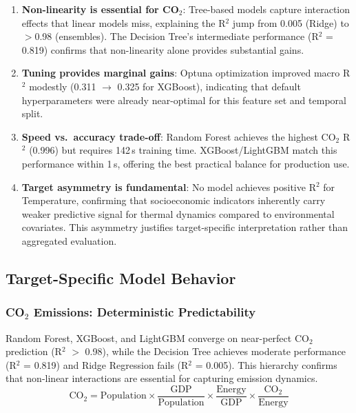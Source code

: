 \documentclass[12pt, a4paper]{article}
\begin{document}
\begin{enumerate}[label=(\arabic*), leftmargin=*]
    \item \textbf{Non-linearity is essential for CO$_2$}: Tree-based models capture interaction effects that linear models miss, explaining the R$^2$ jump from 0.005 (Ridge) to $>$0.98 (ensembles). The Decision Tree's intermediate performance (R$^2$ = 0.819) confirms that non-linearity alone provides substantial gains.
    
    \item \textbf{Tuning provides marginal gains}: Optuna optimization improved macro R$^2$ modestly (0.311 $\rightarrow$ 0.325 for XGBoost), indicating that default hyperparameters were already near-optimal for this feature set and temporal split.
    
    \item \textbf{Speed vs.\ accuracy trade-off}: Random Forest achieves the highest CO$_2$ R$^2$ (0.996) but requires 142\,s training time. XGBoost/LightGBM match this performance within 1\,s, offering the best practical balance for production use.
    
  
    \item \textbf{Target asymmetry is fundamental}: No model achieves positive R$^2$ for Temperature, confirming that socioeconomic indicators inherently carry weaker predictive signal for thermal dynamics compared to environmental covariates. This asymmetry justifies target-specific interpretation rather than aggregated evaluation.
\end{enumerate}

\subsection{Target-Specific Model Behavior}
\subsubsection{CO$_2$ Emissions: Deterministic Predictability}
Random Forest, XGBoost, and LightGBM converge on near-perfect CO$_2$ prediction (R$^2$ $>$ 0.98), while the Decision Tree achieves moderate performance (R$^2$ = 0.819) and Ridge Regression fails (R$^2$ = 0.005). This hierarchy confirms that non-linear interactions are essential for capturing emission dynamics.
\[
\text{CO}_2 = \text{Population} \times \frac{\text{GDP}}{\text{Population}} \times \frac{\text{Energy}}{\text{GDP}} \times \frac{\text{CO}_2}{\text{Energy}}
\]
\end{document}
